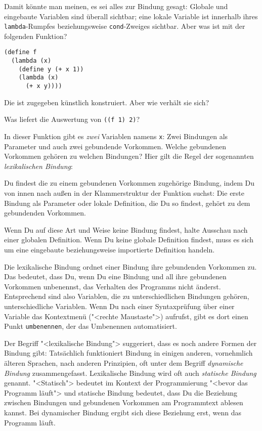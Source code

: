 Damit könnte man meinen, es sei alles zur Bindung gesagt: Globale und
eingebaute Variablen sind überall sichtbar; eine lokale Variable ist
innerhalb ihres \lstinline{lambda}-Rumpfes beziehungsweise
\lstinline{cond}-Zweiges sichtbar.  Aber was ist mit der folgenden
Funktion?
%
\begin{lstlisting}
(define f
  (lambda (x)
    (define y (+ x 1))
    (lambda (x)
      (+ x y))))
\end{lstlisting}
%
Die ist zugegeben künstlich konstruiert.  Aber wie verhält sie sich?
%
\begin{aufgabeinline}
  Was liefert die Auswertung von \lstinline{((f 1) 2)}?
\end{aufgabeinline}
%
In dieser Funktion gibt es \emph{zwei} Variablen namens \lstinline{x}:
Zwei Bindungen als Parameter und auch zwei gebundende Vorkommen.
Welche gebundenen Vorkommen gehören zu welchen Bindungen?  Hier gilt
die Regel der sogenannten \textit{lexikalischen Bindung}:
%
\begin{definition}
  Du findest die zu einem gebundenen Vorkommen zugehörige Bindung,
  indem Du von innen nach außen in der Klammerstruktur der Funktion
  suchst: Die erste Bindung als Parameter oder lokale Definition, die
  Du so findest, gehört zu dem gebundenden Vorkommen.

  Wenn Du auf diese Art und Weise keine Bindung findest, halte
  Ausschau nach einer globalen Definition.  Wenn Du keine globale
  Definition findest, muss es sich um eine eingebaute beziehungsweise
  importierte Definition handeln.
\end{definition}
%
Die lexikalische Bindung ordnet einer Bindung ihre gebundenden
Vorkommen zu.  Das bedeutet, dass Du, wenn Du eine Bindung und all
ihre gebundenen Vorkommen unbenennst, das Verhalten des Programms
nicht änderst.  Entsprechend sind also Variablen, die zu
unterschiedlichen Bindungen gehören, unterschiedliche Variablen.  Wenn
Du nach einer Syntaxprüfung über einer Variable das Kontextmenü
("<rechte Maustaste">) aufrufst, gibt es dort einen Punkt
\texttt{umbenennen}, der das Umbenennen automatisiert.

Der Begriff "<lexikalische Bindung"> suggeriert, dass es noch andere
Formen der Bindung gibt: Tatsächlich funktioniert Bindung in einigen
anderen, vornehmlich älteren Sprachen, nach anderen Prinzipien, oft
unter dem Begriff \textit{dynamische Bindung} zusammengefasst.  Lexikalische
Bindung wird oft auch \textit{statische Bindung} genannt.  "<Statisch"> bedeutet
im Kontext der Programmierung "<bevor das Programm läuft"> und
statische Bindung bedeutet, dass Du die Beziehung zwischen Bindungen
und gebundenen Vorkommen am Programmtext ablesen kannst.  Bei
dynamischer Bindung ergibt sich diese Beziehung erst, wenn das
Programm läuft.


